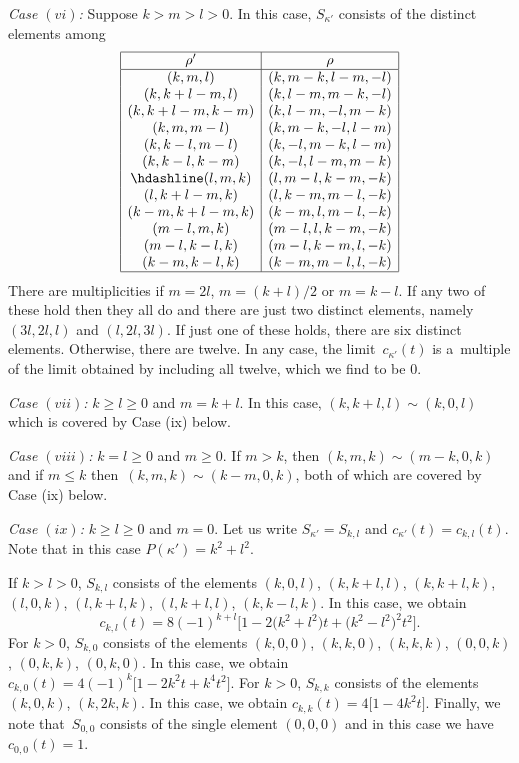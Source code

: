 \documentclass[pdftex]{sigma}
\theoremstyle{definition}
\begin{document}
{\em Case $(vi)$:}
Suppose $k>m>l>0$. In this case, $S_{\kappa'}$ consists of the distinct elements among
\[\begin{array}{|c|c|}
\hline
\rho' & \rho \\ \hline
(k,m,l) & (k,m-k,l-m,-l)\\
(k,k+l-m,l) & (k,l-m,m-k,-l) \\
(k,k+l-m,k-m) & (k,l-m,-l,m-k) \\
(k,m,m-l)& (k,m-k,-l,l-m) \\
(k,k-l,m-l)& (k,-l,m-k,l-m) \\
(k,k-l,k-m)& (k,-l,l-m,m-k) \\
\hdashline

(l,m,k) & (l,m-l,k-m,-k)\\
(l,k+l-m,k) & (l,k-m,m-l,-k)\\
(k-m,k+l-m,k) & (k-m,l,m-l,-k)\\

(m-l,m,k)& (m-l,l,k-m,-k) \\
(m-l,k-l,k)& (m-l,k-m,l,-k) \\
(k-m,k-l,k)& (k-m,m-l,l,-k)\\
\hline
\end{array}
\]
There are multiplicities if $m=2l$, $m=(k+l)/2$ or $m=k-l$.
If any two of these hold then they all do and there are just two distinct elements,
namely $(3l,2l,l)$ and $(l,2l,3l)$. If just one of these holds, there are six distinct elements.
Otherwise, there are twelve. In any case, the limit~$c_{\kappa'}(t)$ is a~multiple of the
limit obtained by including all twelve, which we find to be $0$.

{\em Case $(vii)$:} $k\ge l\ge 0$ and $m=k+l$. In this case, $(k,k+l,l)\sim (k,0,l)$
which is covered by Case (ix) below.


{\em Case $(viii)$:} $k= l\ge 0$ and $m\ge 0$. If $m>k$, then $(k,m,k)\sim (m-k,0,k)$
and if $m\le k$ then~${(k,m,k)\sim (k-m,0,k)}$, both of which are covered by Case (ix) below.

{\em Case $(ix)$:} $k\ge l\ge 0$ and $m=0$.
Let us write $S_{\kappa'}=S_{k,l}$
and $c_{\kappa'}(t)=c_{k,l}(t)$. Note that in this case $P(\kappa')=k^2+l^2$.

If $k>l>0$, $S_{k,l}$ consists of the elements
$(k,0,l)$, $ (k,k+l,l)$, $ (k,k+l,k)$, $(l,0,k)$, $ (l,k+l,k)$, $ (l,k+l,l)$, $ (k,k-l,k)$.
In this case, we obtain
\[c_{k,l}(t)=8(-1)^{k+l}\big[ 1 - 2\big(k^2+l^2\big) t + \big(k^2-l^2\big)^2 t^2\big].\]
For $k>0$, $S_{k,0}$ consists of the elements
$(k,0,0)$, $ (k,k,0)$, $ (k,k,k)$, $ (0,0,k)$, $ (0,k,k)$, $ (0,k,0)$.
In this case, we obtain
$c_{k,0}(t)=4(-1)^{k}\big[ 1 - 2k^2 t + k^4 t^2\big]$.
For $k>0$, $S_{k,k}$ consists of the elements~${(k,0,k)}$, $(k,2k,k)$.
In this case, we obtain
$c_{k,k}(t)=4 \big[ 1 - 4k^2 t \big]$.
Finally, we note that~$S_{0,0}$ consists of the single element $(0,0,0)$
and in this case we have $c_{0,0}(t)=1$.
\end{document}
